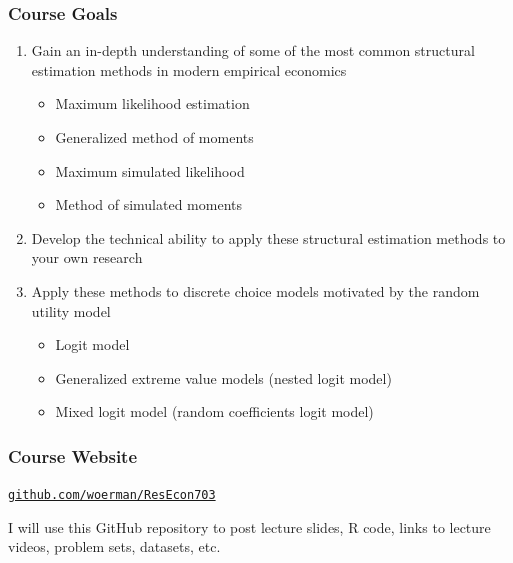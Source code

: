 \documentclass{beamer}
\begin{document}
\begin{frame}\frametitle{Course Goals}
    \begin{enumerate}
        \item Gain an in-depth understanding of some of the most common structural estimation methods in modern empirical economics
        \begin{itemize}
            \item Maximum likelihood estimation
            \item Generalized method of moments
            \item Maximum simulated likelihood
            \item Method of simulated moments
        \end{itemize}
        \vspace{2ex} 
        \item Develop the technical ability to apply these structural estimation methods to your own research
        \vspace{2ex}
        \item Apply these methods to discrete choice models motivated by the random utility model
        \begin{itemize}
            \item Logit model
            \item Generalized extreme value models (nested logit model)
            \item Mixed logit model (random coefficients logit model)
        \end{itemize}
    \end{enumerate}
\end{frame}

\begin{frame}\frametitle{Course Website}
    \begin{center}
        \href{https://github.com/woerman/ResEcon703}{\texttt{github.com/woerman/ResEcon703}}
    \end{center}
    \vspace{3ex}
    I will use this GitHub repository to post lecture slides, R code, links to lecture videos, problem sets, datasets, etc.
\end{frame}
\end{document}
